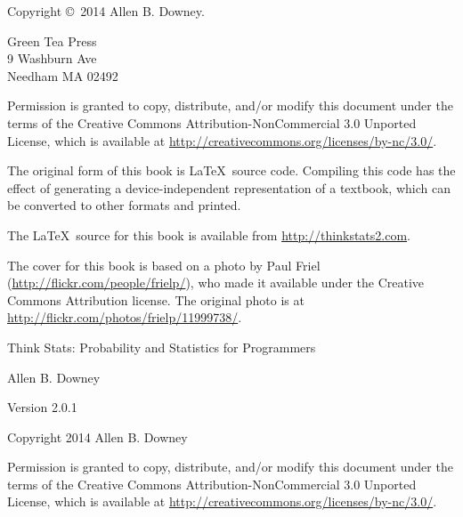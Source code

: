 \documentclass[12pt]{book}
\newcommand{\thetitle}{Think Stats: Probability and Statistics for Programmers}
\newcommand{\theversion}{2.0.1}
\begin{document}
\begin{latexonly}
\begin{flushright}
\vfill

\end{flushright}


\pagebreak
\thispagestyle{empty}

{\small
Copyright \copyright ~2014 Allen B. Downey.


\vspace{0.2in}

\begin{flushleft}
Green Tea Press       \\
9 Washburn Ave \\
Needham MA 02492
\end{flushleft}

Permission is granted to copy, distribute, and/or modify this document
under the terms of the Creative Commons Attribution-NonCommercial 3.0 Unported
License, which is available at \url{http://creativecommons.org/licenses/by-nc/3.0/}.

The original form of this book is \LaTeX\ source code.  Compiling this
code has the effect of generating a device-independent representation
of a textbook, which can be converted to other formats and printed.

The \LaTeX\ source for this book is available from
\url{http://thinkstats2.com}.

The cover for this book is based on a photo by Paul Friel
(\url{http://flickr.com/people/frielp/}), who made it available under
the Creative Commons Attribution license.  The original photo
is at \url{http://flickr.com/photos/frielp/11999738/}.

\vspace{0.2in}

} %

\end{latexonly}



\begin{htmlonly}


{\Large \thetitle}

{\large Allen B. Downey}

Version \theversion

\vspace{0.25in}

Copyright 2014 Allen B. Downey

\vspace{0.25in}

Permission is granted to copy, distribute, and/or modify this document
under the terms of the Creative Commons Attribution-NonCommercial 3.0
Unported License, which is available at
\url{http://creativecommons.org/licenses/by-nc/3.0/}.

\setcounter{chapter}{-1}

\end{htmlonly}
\end{document}
